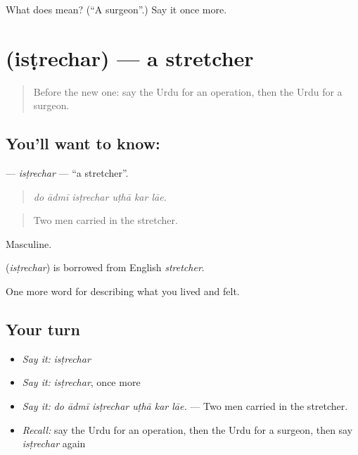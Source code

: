 \begin{tcolorbox}[breakable,colback=teal!4,colframe=teal!35!black,title={Before you move on}]
What does  mean? (\textquotedblleft{}A surgeon\textquotedblright{}.) Say it once more.
\end{tcolorbox}
\section[\texorpdfstring{\ur{اسٹریچر} (isṭrechar)}{اسٹریچر (isṭrechar)}]{ (isṭrechar) — a stretcher}

\label{lesson:UR-C479-istrechar}



\begin{quote}
Before the new one: say the Urdu for an operation, then the Urdu for a surgeon.
\end{quote}

\subsection*{You'll want to know: }
\textbf{} — \emph{isṭrechar} — \textquotedblleft{}a stretcher\textquotedblright{}.

\begin{quote}
     
\end{quote}

\begin{quote}
\emph{do ādmī isṭrechar uṭhā kar lāe.}
\end{quote}

\begin{quote}
Two men carried in the stretcher.
\end{quote}

Masculine.

\begin{cousinweb}
\textbf{} (\emph{isṭrechar}) is borrowed from English \emph{stretcher}.
\end{cousinweb}

\begin{grammarlens}[title={What you've built}]
One more word for describing what you lived and felt.
\end{grammarlens}

\subsection*{Your turn}
\begin{itemize}
\raggedright
  \item \emph{Say it:} \emph{isṭrechar}
  \item \emph{Say it:} \emph{isṭrechar}, once more
  \item \emph{Say it:} \emph{do ādmī isṭrechar uṭhā kar lāe.} — Two men carried in the stretcher.
  \item \emph{Recall:} say the Urdu for an operation, then the Urdu for a surgeon, then say \emph{isṭrechar} again
\end{itemize}

